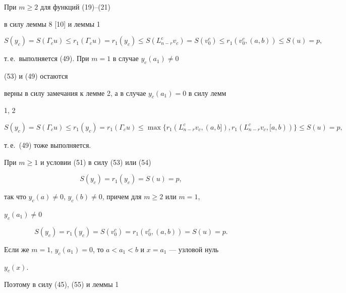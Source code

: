 \begin{pf} При $m\ge 2$ для функций (19)--(21) 


в силу леммы 8 [10] и леммы 1 


\begin{equation} 


S(y_c)=S(\Gamma_c u)\le r_1(\Gamma_c u)=r_1(y_c)\le  


S(L^c_{n-r}v_c)=S(v^c_0)\le 


r_1(v^c_0,(a,b))\le S(u)=p, 


\end{equation} 


т.\,е.~выполняется (49). При $m=1$ в случае $y_c(a_1)\ne 0$ 


(53) и (49) остаются 


верны в силу замечания к лемме 2, а в случае $y_c(a_1)=0$ в силу лемм 


1, 2 


\begin{equation} 


S(y_c)=S(\Gamma_c u)\le r_1(y_c)=r_1(\Gamma_c u)\le 


\max\{r_1(L^c_{n-r}v_c,(a,b]), 


r_1(L^c_{n-r}v_c,[a,b))\}\le S(u)=p, 


\end{equation} 


т.\,е.~(49) тоже выполняется. 


 


При $m\ge 1$ и условии (51) в силу (53) или (54) 


\begin{equation} 


S(y_c)=r_1(y_c)=S(u)=p, 


\end{equation} 


так что $y_c(a)\ne 0$, $y_c(b)\ne 0$, причем для $m\ge 2$ или $m=1$, 


$y_c(a_1)\ne 0$ 


\begin{equation} 


S(y_c)=r_1(y_c)=S(v^c_0)=r_1(v^c_0,(a,b))=S(u)=p. 


\end{equation} 


Если же $m=1$, $y_c(a_1)=0$, то $a<a_1<b$ и $x=a_1$ --- узловой нуль 


$y_c(x)$. 


Поэтому в силу (45), (55) и леммы 1 



\end{pf}
